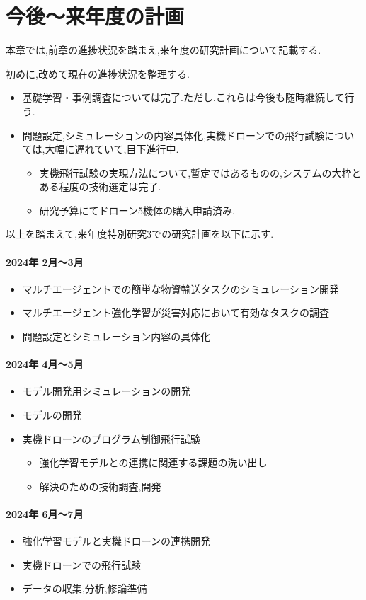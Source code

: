 \documentclass{article}[jsarticle]
\begin{document}
\section{今後～来年度の計画}
本章では,前章の進捗状況を踏まえ,来年度の研究計画について記載する.\par 
初めに,改めて現在の進捗状況を整理する.
\begin{itemize}
    \item 基礎学習・事例調査については完了.ただし,これらは今後も随時継続して行う.
    \item 問題設定,シミュレーションの内容具体化,実機ドローンでの飛行試験については,大幅に遅れていて,目下進行中.
    \begin{itemize}
        \item 実機飛行試験の実現方法について,暫定ではあるものの,システムの大枠とある程度の技術選定は完了.
        \item 研究予算にてドローン5機体の購入申請済み.
    \end{itemize}
\end{itemize}
以上を踏まえて,来年度特別研究3での研究計画を以下に示す.
\paragraph{2024年 2月～3月}
\begin{itemize}
    \item マルチエージェントでの簡単な物資輸送タスクのシミュレーション開発
    \item マルチエージェント強化学習が災害対応において有効なタスクの調査
    \item 問題設定とシミュレーション内容の具体化
\end{itemize}
\paragraph{2024年 4月～5月}
\begin{itemize}
    \item モデル開発用シミュレーションの開発
    \item モデルの開発
    \item 実機ドローンのプログラム制御飛行試験
    \begin{itemize}
        \item 強化学習モデルとの連携に関連する課題の洗い出し
        \item 解決のための技術調査,開発
    \end{itemize}
\end{itemize}
\paragraph{2024年 6月～7月}
\begin{itemize}
    \item 強化学習モデルと実機ドローンの連携開発
    \item 実機ドローンでの飛行試験
    \item データの収集,分析,修論準備
\end{itemize}
\end{document}
